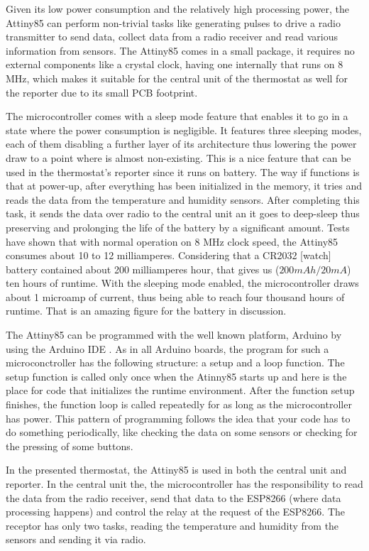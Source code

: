 Given its low power consumption and the relatively high processing power, the Attiny85 can perform non-trivial
tasks like generating pulses to drive a radio transmitter to send data, collect data from a
radio receiver and read various information from sensors.
The Attiny85 comes in a small package, it requires no external components like a crystal clock, having one
internally that runs on 8 MHz, which makes it suitable for the central unit of the thermostat as well for the
reporter due to its small PCB footprint.

The microcontroller comes with a sleep mode feature that enables it to go in a state where the power
consumption is negligible. It features three sleeping modes, each of them disabling a further layer
of its architecture thus lowering the power draw to a point where is almost non-existing.
This is a nice feature that can be used in the thermostat's reporter since it runs on battery.
The way if functions is that at power-up, after everything has been initialized in the memory, it tries and
reads the data from the temperature and humidity sensors. After completing this task, it sends the data over
radio to the central unit an it goes to deep-sleep thus preserving and prolonging the life of the battery
by a significant amount. Tests \cite{website:attiny_sleep_tests} have shown that with normal operation on
8 MHz clock speed, the Attiny85 consumes about 10 to 12 milliamperes. Considering that a CR2032 [watch]
battery contained about 200 milliamperes hour, that gives us ($200 mAh / 20 mA$) ten hours of runtime.
With the sleeping mode enabled, the microcontroller draws about 1 microamp of current, thus being able to reach
four thousand hours of runtime. That is an amazing figure for the battery in discussion.

The Attiny85 can be programmed with the well known platform, Arduino by using the Arduino IDE
\cite{website:attiny85program}.
As in all Arduino boards, the program for such a microconctroller has the following structure: a setup
and a loop function. The setup function is called only once when the Atinny85 starts up and here is the place
for code that initializes the runtime environment. After the function setup finishes, the function loop
is called repeatedly for as long as the microcontroller has power. This pattern of programming follows the
idea that your code has to do something periodically, like checking the data on some sensors or checking for
the pressing of some buttons.

In the presented thermostat, the Attiny85 is used in both the central unit and reporter. In the central unit
the, the microcontroller has the responsibility to read the data from the radio receiver, send that data to
the ESP8266 (where data processing happens) and control the relay at the request of the ESP8266.
The receptor has only two tasks, reading the temperature and humidity from the sensors and sending it via
radio.

